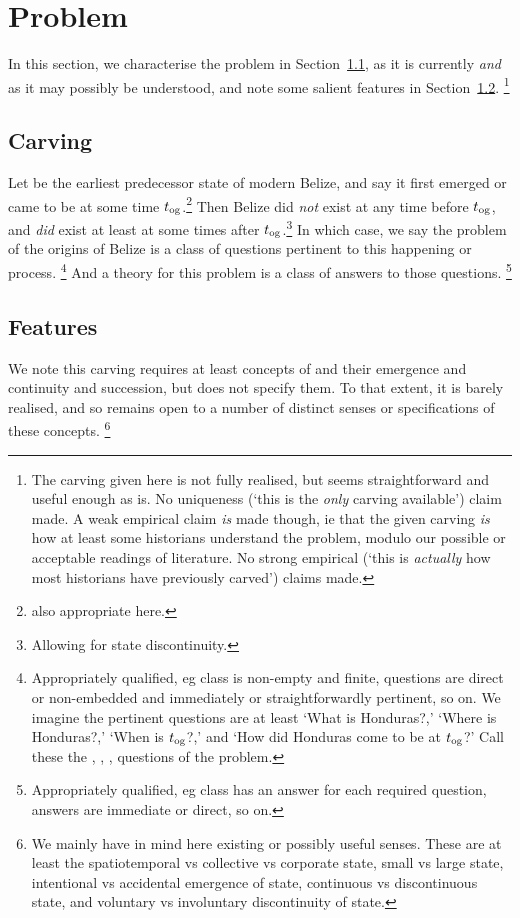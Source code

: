 \section{Problem}
\label{s:problem}
	In this section, we characterise the problem in Section~\ref{ss:carving}, as it is currently \emph{and} as it may possibly be understood, and note some salient features in Section~\ref{ss:features}.%
	\footnote{The carving given here is not fully realised, but seems straightforward and useful enough as is. No uniqueness (`this is the \emph{only} carving available') claim made. A weak empirical claim \emph{is} made though, ie that the given carving \emph{is} how at least some historians understand the problem, modulo our possible or acceptable readings of literature. No strong empirical (`this is \emph{actually} how most historians have previously carved') claims made.}
	\subsection{Carving}
	\label{ss:carving}
		Let  be the earliest predecessor state of modern Belize, and say it first emerged or came to be at some time \(t_{\operatorname{og}}\).\footnote{ also appropriate here.} Then Belize did \emph{not} exist at any time before \(t_{\operatorname{og}}\), and \emph{did} exist at least at some times after \(t_{\operatorname{og}}\).\footnote{Allowing for state discontinuity.} In which case, we say the problem of the origins of Belize is a class of questions pertinent to this happening or process.%
		\footnote{Appropriately qualified, eg class is non-empty and finite, questions are direct or non-embedded and immediately or straightforwardly pertinent, so on. We imagine the pertinent questions are at least `What is Honduras?,' `Where is Honduras?,' `When is \(t_{\operatorname{og}}\)?,' and `How did Honduras come to be at \(t_{\operatorname{og}}\)?' Call these the , , ,  questions of the problem.}
		And a theory for this problem is a class of answers to those questions.%
		\footnote{Appropriately qualified, eg class has an answer for each required question, answers are immediate or direct, so on.}
	\subsection{Features}
	\label{ss:features}
		We note this carving requires at least concepts of  and their emergence and continuity and succession, but does not specify them. To that extent, it is barely realised, and so remains open to a number of distinct senses or specifications of these concepts.%
		\footnote{We mainly have in mind here existing or possibly useful senses. These are at least the spatiotemporal vs collective vs corporate state, small vs large state, intentional vs accidental emergence of state, continuous vs discontinuous state, and voluntary vs involuntary discontinuity of state.}
	
